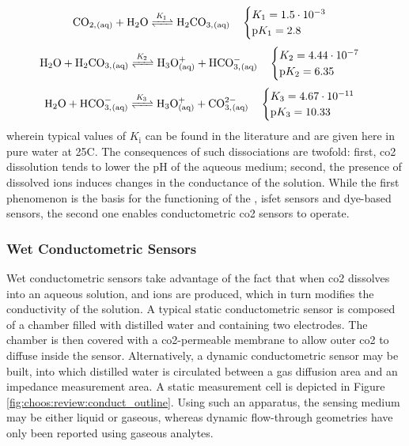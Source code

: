 \begin{equation}\label{eq:choos:rev:co2_diss}
	\ce{CO_{2,(aq)} + H2O <=>[\textit{K}_1][] H2CO_{3,(aq)}} \quad \begin{cases}
		K_1 = 1.5\cdot 10^{-3} \\
		\text{p}K_1 = 2.8
	\end{cases}
\end{equation}
\begin{equation}\label{eq:choos:rev:h2co3_diss}
	\ce{H_2O + H_2CO_{3,(aq)} <=>[\textit{K}_2][] H_3O^+_{(aq)} + HCO^-_{3,(aq)}} \quad
	\begin{cases}
		K_2 = 4.44\cdot 10^{-7} \\ \text{p}K_2 = 6.35
	\end{cases}
\end{equation}
\begin{equation}\label{eq:choos:rev:hco3_diss}
	\ce{H_2O + HCO^-_{3,(aq)} <=>[\textit{K}_3][] H_3O^+_{(aq)} + CO^{2-}_{3,(aq)}} \quad
	\begin{cases}
		K_3 = 4.67\cdot 10^{-11} \\ \text{p}K_3 = 10.33
	\end{cases}
\end{equation}
wherein typical values of $K_\text{i}$ can be found in the literature\cite{millero2006, wang2010} and are given here in pure water at 25{\degree}C. The consequences of such dissociations are twofold: first, \gls{co2} dissolution tends to lower the pH of the aqueous medium; second, the presence of dissolved ions induces changes in the conductance of the solution. While the first phenomenon is the basis for the functioning of the \ssel, \gls{isfet} sensors and dye-based sensors, the second one enables conductometric \gls{co2} sensors to operate.

\subsubsection{Wet Conductometric Sensors}\label{subsect:choos:review:wet_conduct}

Wet conductometric sensors take advantage of the fact that when \gls{co2} dissolves into an aqueous solution,  and  ions are produced, which in turn modifies the conductivity of the solution\cite{baker1996}. A typical static conductometric sensor is composed of a chamber filled with distilled water and containing two electrodes. The chamber is then covered with a \gls{co2}-permeable membrane to allow outer \gls{co2} to diffuse inside the sensor\cite{varlan1997, mirtaheri2004a, mirtaheri2004b}. Alternatively, a dynamic conductometric sensor may be built, into which distilled water is circulated between a gas diffusion area and an impedance measurement area\cite{acock1995, baker1996}. A static measurement cell is depicted in Figure \ref{fig:choos:review:conduct_outline}. Using such an apparatus, the sensing medium may be either liquid or gaseous, whereas dynamic flow-through geometries have only been reported using gaseous analytes.


